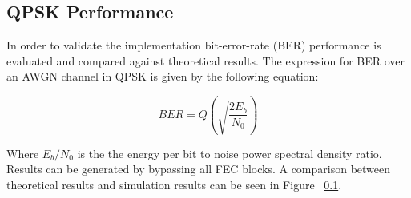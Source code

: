 \documentclass[paper=a4, fontsize=11pt]{scrartcl}	%
\numberwithin{equation}{section}		%
\numberwithin{figure}{section}			%
\numberwithin{table}{section}			%
\begin{document}
\subsection{QPSK Performance}

In order to validate the implementation bit-error-rate (BER) performance is evaluated and compared against theoretical results. The expression for BER over an AWGN channel in QPSK is given by the following equation:

\begin{equation} \label{eq:qpskBer}
BER = Q\left(\sqrt{\frac{2E_b}{N_0}}\right)
\end{equation}

Where $E_b/N_0$ is the the energy per bit to noise power spectral density ratio. Results can be generated by bypassing all FEC blocks. A comparison between theoretical results and simulation results can be seen in Figure ~\ref{}.



\end{document}
